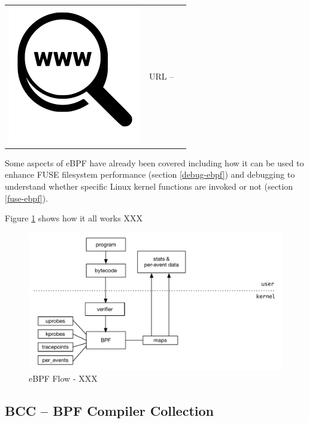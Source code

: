 \begin{table}[h]
\begin{tabular}{lcl}
\parbox[r]{0.5in}{\includegraphics[scale=0.15]{figures/url.png}} & \parbox[l]{0.55in}{URL  -- } & \parbox[l]{3in}{}
\end{tabular}
\end{table}

\noindent
Some aspects of eBPF have already been covered including how it can be used to enhance FUSE filesystem performance (section \ref{debug-ebpf}) and debugging to understand whether specific Linux kernel functions are invoked or not (section \ref{fuse-ebpf}).

Figure \ref{fig:ebpf} shows how it all works XXX

\begin{figure}
	\includegraphics[scale=0.6]{figures/eBPF.pdf}
	\centering
	\caption{eBPF Flow - XXX}
	\label{fig:ebpf}
\end{figure}

\subsection{BCC -- BPF Compiler Collection}

